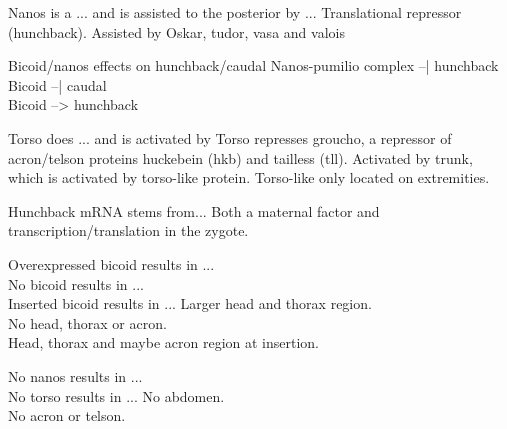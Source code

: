 \begin{flashcard}{Nanos is a ... and is assisted to the posterior by ...}
    Translational repressor (hunchback). Assisted by Oskar, tudor, vasa and valois
\end{flashcard}

\begin{flashcard}{Bicoid/nanos effects on hunchback/caudal}
    Nanos-pumilio complex --| hunchback \\
    Bicoid --| caudal \\
    Bicoid --> hunchback
\end{flashcard}

\begin{flashcard}{Torso does ... and is activated by}
    Torso represses groucho, a repressor of acron/telson proteins huckebein (hkb) and tailless (tll). Activated by trunk, which is activated by torso-like protein. Torso-like only located on extremities. 
\end{flashcard}

\begin{flashcard}{Hunchback mRNA stems from...}
    Both a maternal factor and transcription/translation in the zygote. 
\end{flashcard}

\begin{flashcard}{Overexpressed bicoid results in ... \\ No bicoid results in ... \\ Inserted bicoid results in ... }
    Larger head and thorax region. \\
    No head, thorax or acron. \\
    Head, thorax and maybe acron region at insertion. 
\end{flashcard}

\begin{flashcard}{No nanos results in ... \\ No torso results in ...}
    No abdomen. \\
    No acron or telson.
\end{flashcard}
